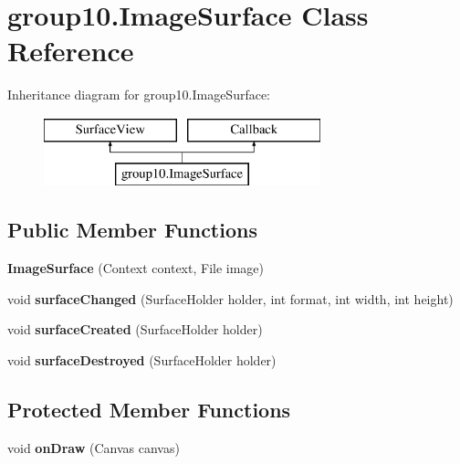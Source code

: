 \hypertarget{classgroup10_1_1_image_surface}{}\section{group10.\+Image\+Surface Class Reference}
\label{classgroup10_1_1_image_surface}
Inheritance diagram for group10.\+Image\+Surface\+:\begin{figure}[H]
\begin{center}
\leavevmode
\includegraphics[height=2.000000cm]{classgroup10_1_1_image_surface}
\end{center}
\end{figure}
\subsection*{Public Member Functions}
\begin{DoxyCompactItemize}
\item 
\mbox{\label{classgroup10_1_1_image_surface_acb219d08e16a74ff7ab58c2957c29aac}} 
{\bfseries Image\+Surface} (Context context, File image)
\item 
\mbox{\label{classgroup10_1_1_image_surface_a2940f5fa002d6230fb587258fb283df8}} 
void {\bfseries surface\+Changed} (Surface\+Holder holder, int format, int width, int height)
\item 
\mbox{\label{classgroup10_1_1_image_surface_a3138d80ebcd6592d39c3a772cab911a0}} 
void {\bfseries surface\+Created} (Surface\+Holder holder)
\item 
\mbox{\label{classgroup10_1_1_image_surface_aa7b7e12958e9fb0d40185344bb721afa}} 
void {\bfseries surface\+Destroyed} (Surface\+Holder holder)
\end{DoxyCompactItemize}
\subsection*{Protected Member Functions}
\begin{DoxyCompactItemize}
\item 
\mbox{\label{classgroup10_1_1_image_surface_aabe5cce015004a489330069414a9c5eb}} 
void {\bfseries on\+Draw} (Canvas canvas)
\end{DoxyCompactItemize}
